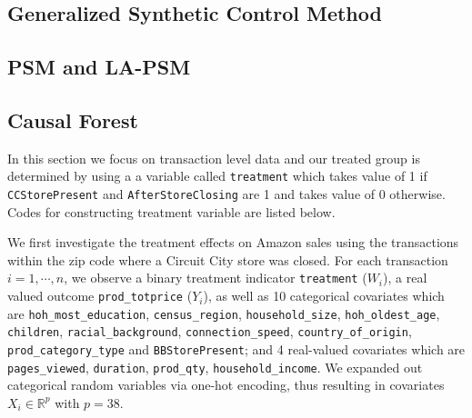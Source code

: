 \documentclass{article}
\begin{document}
\subsection{Generalized Synthetic Control Method}


\subsection{PSM and LA-PSM}


\subsection{Causal Forest}
In this section we focus on transaction level data and our treated group is determined by using a 
a variable called \texttt{treatment} which takes value of 1 if \texttt{CCStorePresent} and \texttt{AfterStoreClosing} are 1 and takes value of 0 otherwise. \\

Codes for constructing treatment variable are listed below.


We first investigate the treatment effects on Amazon sales using the transactions within the zip code where a Circuit City store was closed. For each transaction $i=1, \cdots, n$, we observe a binary treatment indicator \texttt{treatment} ($W_i$), a real valued outcome \texttt{prod\_totprice} ($Y_i$), as well as 10 categorical covariates which are \texttt{hoh\_most\_education}, \texttt{census\_region}, \texttt{household\_size}, \texttt{hoh\_oldest\_age}, \texttt{children}, \texttt{racial\_background}, \texttt{connection\_speed}, \texttt{country\_of\_origin}, \texttt{prod\_category\_type} and \texttt{BBStorePresent}; and 4 real-valued covariates which are \texttt{pages\_viewed}, \texttt{duration}, \texttt{prod\_qty}, \texttt{household\_income}. We expanded out categorical random variables via one-hot encoding, thus resulting in covariates $X_i \in \mathbb{R}^p$  with $p = 38$. \\
\end{document}
